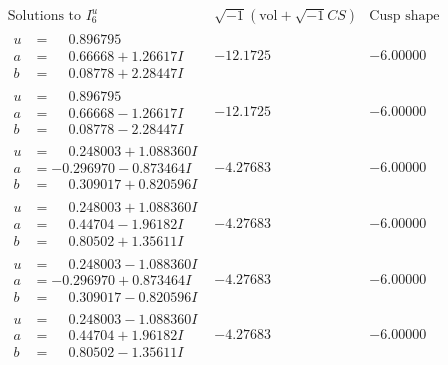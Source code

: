 \documentclass[1p]{elsarticle_modified}
\theoremstyle{definition}
\newcommand{\I}{\sqrt{-1}}
\begin{document}
$$\begin{array}{c|c|c}  
\text{Solutions to }I^u_{6}& \I (\text{vol} + \sqrt{-1}CS) & \text{Cusp shape}\\
 \hline 
\begin{aligned}
u &= \phantom{-}0.896795\phantom{ +0.000000I} \\
a &= \phantom{-}0.66668 + 1.26617 I \\
b &= \phantom{-}0.08778 + 2.28447 I\end{aligned}
 & -12.1725\phantom{ +0.000000I} & -6.00000\phantom{ +0.000000I} \\ \hline\begin{aligned}
u &= \phantom{-}0.896795\phantom{ +0.000000I} \\
a &= \phantom{-}0.66668 - 1.26617 I \\
b &= \phantom{-}0.08778 - 2.28447 I\end{aligned}
 & -12.1725\phantom{ +0.000000I} & -6.00000\phantom{ +0.000000I} \\ \hline\begin{aligned}
u &= \phantom{-}0.248003 + 1.088360 I \\
a &= -0.296970 - 0.873464 I \\
b &= \phantom{-}0.309017 + 0.820596 I\end{aligned}
 & -4.27683\phantom{ +0.000000I} & -6.00000\phantom{ +0.000000I} \\ \hline\begin{aligned}
u &= \phantom{-}0.248003 + 1.088360 I \\
a &= \phantom{-}0.44704 - 1.96182 I \\
b &= \phantom{-}0.80502 + 1.35611 I\end{aligned}
 & -4.27683\phantom{ +0.000000I} & -6.00000\phantom{ +0.000000I} \\ \hline\begin{aligned}
u &= \phantom{-}0.248003 - 1.088360 I \\
a &= -0.296970 + 0.873464 I \\
b &= \phantom{-}0.309017 - 0.820596 I\end{aligned}
 & -4.27683\phantom{ +0.000000I} & -6.00000\phantom{ +0.000000I} \\ \hline\begin{aligned}
u &= \phantom{-}0.248003 - 1.088360 I \\
a &= \phantom{-}0.44704 + 1.96182 I \\
b &= \phantom{-}0.80502 - 1.35611 I\end{aligned}
 & -4.27683\phantom{ +0.000000I} & -6.00000\phantom{ +0.000000I} \\ \hline\begin{aligned}

\end{aligned}
\end{array}$$
\end{document}
